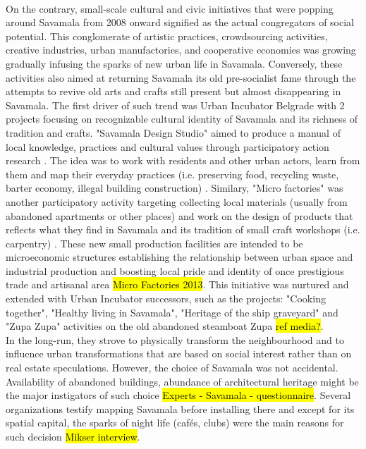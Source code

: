\documentclass[11pt]{report}
\begin{document}
\\
On the contrary, small-scale cultural and civic initiatives that were popping around Savamala from 2008 onward signified as the actual congregators of social potential.
This conglomerate of artistic practices, crowdsourcing activities, creative industries, urban manufactories, and cooperative economies was growing gradually infusing the sparks of new urban life in Savamala.
Conversely, these activities also aimed at returning Savamala its old pre-socialist fame through the attempts to revive old arts and crafts still present but almost disappearing in Savamala.
The first driver of such trend was Urban Incubator Belgrade with 2 projects focusing on recognizable cultural identity of Savamala and its richness of tradition and crafts.
"Savamala Design Studio" aimed to produce a manual of local knowledge, practices and cultural values through participatory action research \cite{Cvetinovic et al 2013}. The idea was to work with residents and other urban actors, learn from them and map their everyday practices (i.e. preserving food, recycling waste, barter economy, illegal building construction) \cite{Cvetinovic et al 2013}.
Similary, "Micro factories" was another participatory activity targeting collecting local materials (usually from abandoned apartments or other places) and work on the design of products that reflects what they find in Savamala and its tradition of small craft workshops (i.e. carpentry) \cite{Cvetinovic et al 2013}. 
These new small production facilities are intended to be microeconomic structures establishing the relationship between urban space and industrial production and boosting local pride and identity of once prestigious trade and artisanal area \hl{Micro Factories 2013}.
This initiative was nurtured and extended with Urban Incubator successors, such as the projects: "Cooking together", "Healthy living in Savamala", "Heritage of the ship graveyard" and "Zupa Zupa" activities on the old abandoned steamboat Zupa \hl{ref media?}.
\\
In the long-run, they strove to physically transform the neighbourhood and to influence urban transformations that are based on social interest rather than on real estate speculations. 
However, the choice of Savamala was not accidental.
Availability of abandoned buildings, abundance of architectural heritage might be the major instigators of such choice \hl{Experts - Savamala - questionnaire}.
Several organizations testify mapping Savamala before installing there and except for its spatial capital, the sparks of night life (cafés, clubs) were the main reasons for such decision \hl{Mikser interview}.
\end{document}
